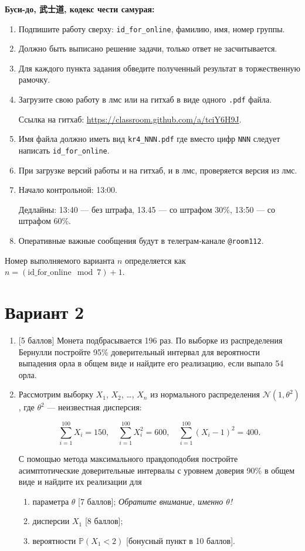 \documentclass[12pt]{article}
\def \cN{\mathcal{N}}
\def \P{\mathbb{P}}
\newcommand \id {\mathrm{id}\_\mathrm{for}\_\mathrm{online}}
\begin{document}
\textbf{Буси-до, 武士道, кодекс чести самурая:}

\vspace{5mm}

\begin{enumerate}
\item Подпишите работу сверху: \verb|id_for_online|, фамилию, имя, номер группы.
\item Должно быть выписано решение задачи, только ответ не засчитывается.
\item Для каждого пункта задания обведите полученный результат в торжественную рамочку.
\item Загрузите свою работу в лмс или на гитхаб в виде одного \verb|.pdf| файла.

Ссылка на гитхаб: \url{https://classroom.github.com/a/tciY6H9J}.
\item Имя файла должно иметь вид \verb|kr4_NNN.pdf| где вместо цифр \verb|NNN| следует написать \verb|id_for_online|.
\item При загрузке версий работы и на гитхаб, и в лмс, проверяется версия из лмс. 
\item Начало контрольной: 13:00. 

Дедлайны: 13:40 — без штрафа, 13.45 — со штрафом 30\%, 13:50 — со штрафом 60\%.
\item Оперативные важные сообщения будут в телеграм-канале \verb|@room112|.
\end{enumerate}


\newpage
Номер выполняемого варианта $n$ определяется как $n=(\id \mod 7)+1$. 

\section*{Вариант 2}


\begin{enumerate}

\item {[5 баллов]} Монета подбрасывается 196 раз. По выборке из распределения Бернулли
постройте 95\% доверительный интервал для вероятности выпадения орла в общем виде и найдите его
реализацию, если выпало 54 орла.

\item Рассмотрим выборку $X_1$, $X_2$, \ldots, $X_n$ из нормального распределения $\cN(1, \theta^2)$, 
где $\theta^2$ — неизвестная дисперсия:

\[
\sum_{i=1}^{100} X_i = 150, \quad \sum_{i=1}^{100} X_i^2 = 600, \quad \sum_{i=1}^{100} (X_i - 1)^2 = 400.  
\]

С помощью метода максимального правдоподобия 
постройте асимптотические доверительные интервалы с уровнем доверия 90\% в общем виде и найдите их реализации для  

\begin{enumerate}
\item параметра $\theta$ {[7 баллов]}; \textit{Обратите внимание, именно $\theta$!}
\item дисперсии $X_1$ {[8 баллов]};
\item вероятности $\P(X_1 < 2)$ {[бонусный пункт в 10 баллов]}.
\end{enumerate}

\end{enumerate}
\end{document}
